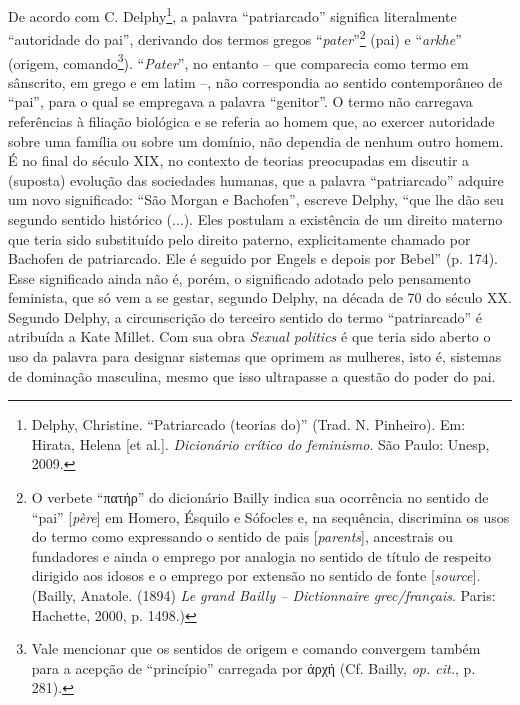 De acordo com C. Delphy\footnote{Delphy, Christine. ``Patriarcado
  (teorias do)'' (Trad. N. Pinheiro). Em: Hirata, Helena {[}et al.{]}.
  \emph{Dicionário crítico do feminismo}. São Paulo: Unesp, 2009.}, a
palavra ``patriarcado'' significa literalmente ``autoridade do pai'',
derivando dos termos gregos ``\emph{pater}''\footnote{O verbete
  ``πατήρ'' do dicionário Bailly indica sua ocorrência no sentido de
  ``pai'' {[}\emph{père}{]} em Homero, Ésquilo e Sófocles e, na
  sequência, discrimina os usos do termo como expressando o sentido de
  pais {[}\emph{parents}{]}, ancestrais ou fundadores e ainda o emprego
  por analogia no sentido de título de respeito dirigido aos idosos e o
  emprego por extensão no sentido de fonte {[}\emph{source}{]}. (Bailly,
  Anatole. (1894) \emph{Le grand Bailly -- Dictionnaire grec/français}.
  Paris: Hachette, 2000, p. 1498.)} (pai) e ``\emph{arkhe}'' (origem,
comando\footnote{Vale mencionar que os sentidos de origem e comando
  convergem também para a acepção de ``princípio'' carregada por άρχή
  (Cf. Bailly, \emph{op. cit.}, p. 281).}). ``\emph{Pater}'', no entanto
-- que comparecia como termo em sânscrito, em grego e em latim --, não
correspondia ao sentido contemporâneo de ``pai'', para o qual se
empregava a palavra ``genitor''. O termo não carregava referências à
filiação biológica e se referia ao homem que, ao exercer autoridade
sobre uma família ou sobre um domínio, não dependia de nenhum outro
homem. É no final do século XIX, no contexto de teorias preocupadas em
discutir a (suposta) evolução das sociedades humanas, que a palavra
``patriarcado'' adquire um novo significado: ``São Morgan e Bachofen'',
escreve Delphy, ``que lhe dão seu segundo sentido histórico (...). Eles
postulam a existência de um direito materno que teria sido substituído
pelo direito paterno, explicitamente chamado por Bachofen de
patriarcado. Ele é seguido por Engels e depois por Bebel'' (p. 174).
Esse significado ainda não é, porém, o significado adotado pelo
pensamento feminista, que só vem a se gestar, segundo Delphy, na década
de 70 do século XX. Segundo Delphy, a circunscrição do terceiro sentido
do termo ``patriarcado'' é atribuída a Kate Millet. Com sua obra
\emph{Sexual politics} é que teria sido aberto o uso da palavra para
designar sistemas que oprimem as mulheres, isto é, sistemas de dominação
masculina, mesmo que isso ultrapasse a questão do poder do pai.

